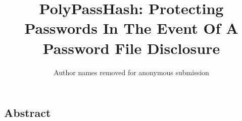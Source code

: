 \documentclass{sig-alternate}
\begin{document}

\newcommand{\cappos}[1]{{\color{red} [JustinC: #1]}}
\newcommand{\eat}[1]{}

\newcommand{\showurlx}{[redacted]}


\lstset{basicstyle=\small, stringstyle=\ttfamily}

\date{}

\title{PolyPassHash: Protecting Passwords In The Event Of A Password File 
Disclosure}


\author{ Author names removed for anonymous submission}

\maketitle

\thispagestyle{empty}

\subsection*{Abstract}






















%







\end{document}
